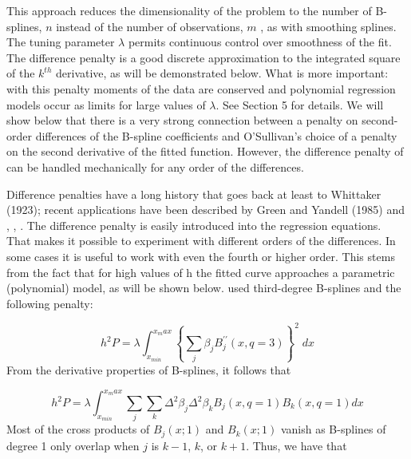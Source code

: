 \documentclass[12pt]{article}
\newcommand*\needsparaphrased{\color{red}}
\begin{document}
{This approach reduces the dimensionality of the problem to the number of B-splines, $n$ instead of the number of observations, $m$ , as with smoothing splines. The tuning parameter $\lambda$ permits continuous control over smoothness of the fit. The difference penalty is a good discrete approximation to the integrated square of the $k^{th}$ derivative, as will be demonstrated below. { \needsparaphrased  What is more important: with this penalty moments of the data are conserved and polynomial regression models occur as limits for large values of $\lambda$. See Section 5 for details. We will show below that there is a very strong connection between a penalty on second-order differences of the B-spline coefficients and O'Sullivan's choice of a penalty on the second derivative of the fitted function. However, the difference penalty of \cite{eilers1996flexible} can be handled mechanically for any order of the differences.}

{ \needsparaphrased Difference penalties have a long history that goes back at least to Whittaker (1923); recent applications have been described by Green and Yandell (1985) and \cite{eilers1991penalized}, \cite{eilers1991nonparametric}, \cite{eilers1995indirect}. The difference penalty is easily introduced into the regression equations. That makes it possible to experiment with different orders of the differences. In some cases it is useful to work with even the fourth or higher order. This stems from the fact that for high values of h the fitted curve approaches a parametric (polynomial) model, as will be shown below.
\cite{o1986statistical} used third-degree B-splines and the following penalty:}

\begin{equation} \label{eq:osullivan_univariate_bspline_penalty}
h^2 P = \lambda \int_{x_{min}}^{x_max} \left\{ \sum_{j}  \beta_j B_j^{\prime \prime} \left(x, q=3\right) \right\}^2\; dx
\end{equation}
\noindent
From the derivative properties of B-splines, it follows that

\begin{equation} \label{osullivan_univariate_bspline_penalty_via_deriv}
h^2 P = \lambda \int_{x_{min}}^{x_max}  \sum_{j} \sum_{k} \Delta^2 \beta_j \Delta^2 \beta_k B_j\left(x,q=1\right)B_k\left(x,q=1\right) dx 
\end{equation}
\noindent
Most of the cross products of $B_j(x; 1)$ and $B_k(x;1)$ vanish as B-splines of degree 1 only overlap when $j$ is $k-1$, $k$, or $k+1$. Thus, we have that

}
\end{document}
